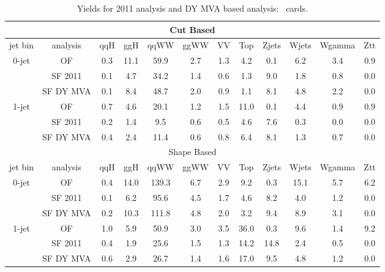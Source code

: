\begin{table}[!ht]
\begin{center}
\begin{tabular} {|cc|cccccccccc|}
\hline
\multicolumn{12}{|c|}{Cut Based} \\
\hline
jet bin & analysis         & qqH & ggH & qqWW & ggWW & VV & Top & Zjets & Wjets & Wgamma & Ztt \\
\hline
\multirow{3}{*}{0-jet} & OF        & 0.3 & 11.1 & 59.9 &  2.7 &  1.3 &  4.2 &  0.1 &  6.2 &  3.4 &  0.9 \\
                       & SF 2011   & 0.1 &  4.7 & 34.2 &  1.4 &  0.6 &  1.3 &  9.0 &  1.8 &  0.8 &  0.0 \\
                       & SF DY MVA & 0.1 &  8.4 & 48.7 &  2.0 &  0.9 &  1.1 &  8.1 &  4.8 &  2.2 &  0.0 \\
\hline
\multirow{3}{*}{1-jet} & OF        & 0.7 &  4.6 & 20.1 &  1.2 &  1.5 & 11.0 &  0.1 &  4.4 &  0.9 &  0.9 \\
                       & SF 2011   & 0.2 &  1.4 &  9.5 &  0.6 &  0.5 &  4.6 &  7.6 &  0.3 &  0.0 &  0.0 \\
                       & SF DY MVA & 0.4 &  2.4 & 11.4 &  0.6 &  0.8 &  6.4 &  8.1 &  1.3 &  0.7 &  0.0 \\
\hline
\hline
\multicolumn{12}{|c|}{Shape Based} \\
\hline
jet bin & analysis         & qqH & ggH & qqWW & ggWW & VV & Top & Zjets & Wjets & Wgamma & Ztt \\
\hline
\multirow{3}{*}{0-jet} & OF        & 0.4 & 14.0 &139.3 &  6.7 &  2.9 &  9.2 &  0.3 & 15.1 &  5.7 &  6.2 \\
                       & SF 2011   & 0.1 &  6.2 & 95.6 &  4.5 &  1.7 &  4.6 &  8.2 &  4.0 &  1.2 &  0.0 \\
                       & SF DY MVA & 0.2 & 10.3 &111.8 &  4.8 &  2.0 &  3.2 &  9.4 &  8.9 &  3.1 &  0.0 \\
\hline
\multirow{3}{*}{1-jet} & OF        & 1.0 &  5.9 & 50.9 &  3.0 &  3.5 & 36.0 &  0.3 &  9.6 &  1.4 &  9.2 \\
                       & SF 2011   & 0.4 &  1.9 & 25.6 &  1.5 &  1.3 & 14.2 & 14.8 &  2.4 &  0.5 &  0.0 \\
                       & SF DY MVA & 0.6 &  2.9 & 26.7 &  1.4 &  1.6 & 17.0 &  9.5 &  4.8 &  1.2 &  0.0 \\
\hline
\end{tabular}
\caption{Yields for 2011 analysis and DY MVA based analysis:  \GeVcc\ cards.}
\label{tab:cardsdymva}
\end{center}
\end{table}


